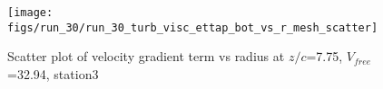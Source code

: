 \begin{figure}[H]
\centering
\texttt{[image: figs/run\_30/run\_30\_turb\_visc\_ettap\_bot\_vs\_r\_mesh\_scatter]}
\caption{Scatter plot of velocity gradient term vs radius at $z/c$=7.75, $V_{free}$=32.94, station3}
\label{fig:run_30_turb_visc_ettap_bot_vs_r_mesh_scatter}
\end{figure}


